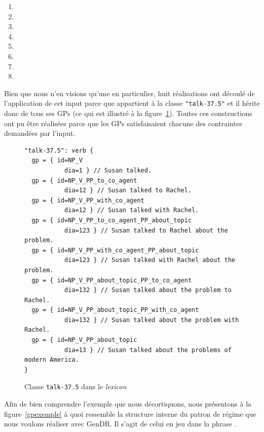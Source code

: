 \begin{enumerate}
  \item {}
  \item {}
  \item {}
  \item {}
  \item {}
  \item {}
  \item {}
  \item {}
\end{enumerate}

Bien que nous n'en visions qu'une en particulier, huit réalisations ont découlé de l'application de cet input parce que  appartient à la classe \texttt{"talk-37.5"} et il hérite donc de tous ses \acp{GP} (ce qui est illustré à la figure~\ref{fig:classtalk375}). Toutes ces constructions ont pu être réalisées parce que les \acp{GP} satisfaisaient chacune des contraintes demandées par l'input.

\begin{figure}[htb]
  \caption{Classe \texttt{talk-37.5} dans le \emph{lexicon}}
	\label{fig:classtalk375}
\begin{lstlisting}[language=mate]
"talk-37.5": verb {
  gp = { id=NP_V
	       dia=1 } // Susan talked.
  gp = { id=NP_V_PP_to_co_agent
	       dia=12 } // Susan talked to Rachel.
  gp = { id=NP_V_PP_with_co_agent
	       dia=12 } // Susan talked with Rachel.
  gp = { id=NP_V_PP_to_co_agent_PP_about_topic
	       dia=123 } // Susan talked to Rachel about the problem.
  gp = { id=NP_V_PP_with_co_agent_PP_about_topic
	       dia=123 } // Susan talked with Rachel about the problem.
  gp = { id=NP_V_PP_about_topic_PP_to_co_agent
	       dia=132 } // Susan talked about the problem to Rachel.
  gp = { id=NP_V_PP_about_topic_PP_with_co_agent
	       dia=132 } // Susan talked about the problem with Rachel.
  gp = { id=NP_V_PP_about_topic
	       dia=13 } // Susan talked about the problems of modern America.
}
\end{lstlisting}
\end{figure}

Afin de bien comprendre l'exemple que nous décortiquons, nous présentons à la figure~\ref{gpexemple} à quoi ressemble la structure interne du patron de régime que nous voulons réaliser avec GenDR. Il s'agit de celui en jeu dans la phrase .

